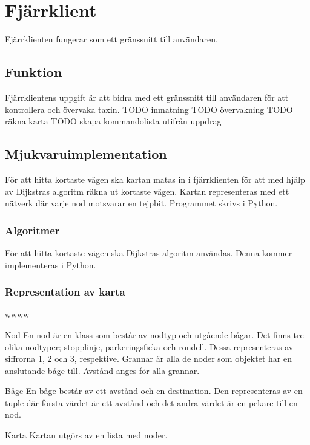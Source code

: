 \documentclass[designspec/spec.tex]{subfiles}
\begin{document}
\section{Fjärrklient}
Fjärrklienten fungerar som ett gränssnitt till användaren.

\subsection{Funktion}
Fjärrklientens uppgift är att bidra med ett gränssnitt till användaren för att
kontrollera och övervaka taxin.
TODO inmatning
TODO övervakning
TODO räkna karta
TODO skapa kommandolista utifrån uppdrag

\subsection{Mjukvaruimplementation}
För att hitta kortaste vägen ska kartan matas in i fjärrklienten för att med
hjälp av Dijkstras algoritm räkna ut kortaste vägen. Kartan
representeras med ett nätverk där varje nod motsvarar en tejpbit. Programmet
skrivs i Python.

\subsubsection{Algoritmer}
För att hitta kortaste vägen ska Dijkstras algoritm användas. Denna kommer
implementeras i Python.

\subsubsection{Representation av karta}

\begin{labeling}{wwww}
    \item[Nod] En nod är en klass som består av nodtyp och utgående bågar. Det
    finns tre olika nodtyper; stopplinje, parkeringsficka och rondell. Dessa
    representeras av siffrorna 1, 2 och 3, respektive.
    Grannar är alla de noder som objektet har en anslutande båge till. Avstånd
    anges för alla grannar.

    \item[Båge] En båge består av ett avstånd och en destination. Den
    representeras av en tuple där första värdet är ett avstånd och det andra
    värdet är en pekare till en nod.

    \item[Karta] Kartan utgörs av en lista med noder.
\end{labeling}
\end{document}
